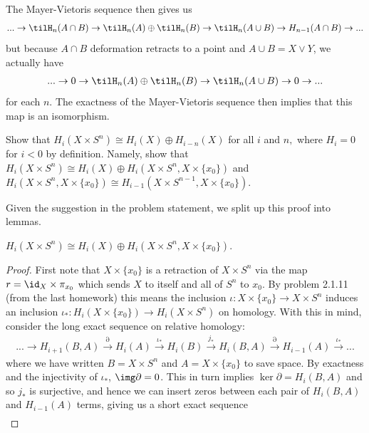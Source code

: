 \begin{homework}[e]
\begin{prf}
    The Mayer-Vietoris sequence then gives us
    \begin{align*}
      ... \to \tilH_n(A\cap B) \to \tilH_n(A)\oplus \tilH_n(B) \to \tilH_n(A\cup B) \to H_{n-1}(A\cap B)\to ...
    \end{align*}
    but because $A\cap B$ deformation retracts to a point and $A\cup B = X\vee Y$, we actually have
    \begin{align*}
      ... \to 0 \to \tilH_n(A)\oplus \tilH_n(B) \to \tilH_n(A\cup B)\to 0 \to ...
    \end{align*}
    for each $n$. The exactness of the Mayer-Vietoris sequence then implies that this map is an isomorphism.
  \end{prf}
   Show that $H_i(X\times S^n)\cong H_i(X)\oplus H_{i-n}(X)$ for all $i$ and $n,$ where $H_i = 0$ for $i < 0$ by definition. Namely, show that $H_i(X\times S^n)\cong H_i(X) \oplus H_i(X\times S^n, X\times \{x_0\})$ and $H_i(X\times S^n, X\times \{x_0\}) \cong H_{i-1}(X\times S^{n-1},X\times \{x_0\})$.
  \begin{prf}
    Given the suggestion in the problem statement, we split up this proof into lemmas.
    \begin{lem}\label{lem:problem2.2.36a}
      $H_i(X\times S^n)\cong H_i(X) \oplus H_i(X\times S^n,X\times \{x_0\})$.
    \end{lem}
    \begin{proof}
      First note that $X\times \{x_0\}$ is a retraction of $X\times S^n$ via the map $r = \id_X\times \pi_{x_0}$ which sends $X$ to itself and all of $S^n$ to $x_0$. By problem 2.1.11 (from the last homework) this means the inclusion $\iota:X\times \{x_0\}\to X\times S^n$ induces an inclusion $\iota_*:H_i(X\times \{x_0\}) \to H_i(X\times S^n)$ on homology. With this in mind, consider the long exact sequence on relative homology:
      \begin{align*}
        ...\to H_{i+1}(B,A) \xrightarrow{\partial} H_i(A) \xrightarrow{\iota_*} H_i(B) \xrightarrow{j_*} H_i(B,A) \xrightarrow{\partial} H_{i-1}(A) \xrightarrow{\iota_*} ...
      \end{align*}
      where we have written $B = X\times S^n$ and $A = X\times \{x_0\}$ to save space. By exactness and the injectivity of $\iota_*$, $\img \partial = 0$. This in turn implies $\ker\partial = H_i(B,A)$ and so $j_*$ is surjective, and hence we can insert zeros between each pair of $H_i(B,A)$ and $H_{i-1}(A)$ terms, giving us a short exact sequence
      \begin{align*}

\end{align*}
\end{proof}
\end{prf}
\end{homework}
